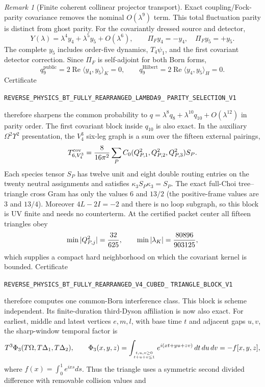 \documentclass[11pt]{article}
\theoremstyle{definition}
\theoremstyle{remark}
\newtheorem{remark}[theorem]{Remark}
\begin{document}
\begin{remark}[Finite coherent collinear projector transport]
Exact coupling/Fock-parity covariance removes the nominal
$O(\lambda^9)$ term.  This total fluctuation parity is distinct from ghost
parity.  For the covariantly dressed source and detector,
\[
 Y(\lambda)=\lambda^4y_4+\lambda^5y_5+O(\lambda^6),\qquad
 \Pi_Fy_4=-y_4,\quad \Pi_Fy_5=+y_5.
\]
The complete $y_5$ includes order-five dynamics, $T_4\psi_1$, and the first
covariant detector correction.  Since $\Pi_F$ is self-adjoint for both Born
forms,
\[
 q_9^{\mathrm{public}}=2\operatorname{Re}\langle y_4,y_5\rangle_K=0,
 \qquad
 q_9^{\mathrm{Hilbert}}=2\operatorname{Re}\langle y_4,y_5\rangle_H=0.
\]
Certificate
\par\noindent
\texttt{REVERSE\_PHYSICS\_BT\_FULLY\_REARRANGED\_LAMBDA9\_}
\allowbreak\texttt{PARITY\_SELECTION\_V1}
\par\noindent
therefore sharpens the common probability to
$q=\lambda^8q_8+\lambda^{10}q_{10}+O(\lambda^{12})$ in parity order.  The
first covariant block inside $q_{10}$ is also exact.  In the auxiliary
$\Omega^2\Upsilon^2$ presentation, the $V_4^3$ six-leg graph is a sum over
the fifteen external pairings,
\[
 T_{6,V_4^3}^{\rm cov}={8\over16\pi^2}\sum_P
 C_0(Q_{P,1}^2,Q_{P,2}^2,Q_{P,3}^2)S_P .
\]
Each species tensor $S_P$ has twelve unit and eight double routing entries on
the twenty neutral assignments and satisfies
$\kappa_3S_P\kappa_3=S_P$.  The exact full-Choi tree--triangle cross Gram has
only the values $6$ and $13/2$ (the positive-frame values are $3$ and
$13/4$).  Moreover $4L-2I=-2$ and there is no loop subgraph, so
this block is UV finite and needs no counterterm.  At the certified packet
center all fifteen triangles obey
\[
 \min|Q_{P,j}^2|={32\over625},\qquad
 \min|\lambda_K|={80896\over903125},
\]
which supplies a compact hard neighborhood on which the covariant kernel is
bounded.  Certificate
\par\noindent
\texttt{REVERSE\_PHYSICS\_BT\_FULLY\_REARRANGED\_V4\_CUBED\_}
\allowbreak\texttt{TRIANGLE\_BLOCK\_V1}
\par\noindent
therefore computes one common-Born interference class.  This block is scheme
independent.  Its finite-duration third-Dyson affiliation is now also exact.
For earliest, middle and latest vertices $e,m,l$, with base time $t$ and
adjacent gaps $u,v$, the sharp-window temporal factor is
\[
 T^3\Phi_3(T\Omega,T\Delta_1,T\Delta_2),\qquad
 \Phi_3(x,y,z)=\int_{t,u,v\geq0\atop t+u+v\leq1}
 e^{i(xt+yu+zv)}\,dt\,du\,dv=-f[x,y,z],
\]
where $f(x)=\int_0^1e^{ixs}ds$.  Thus the triangle uses a symmetric second
divided difference with removable collision values and

\end{remark}
\end{document}

